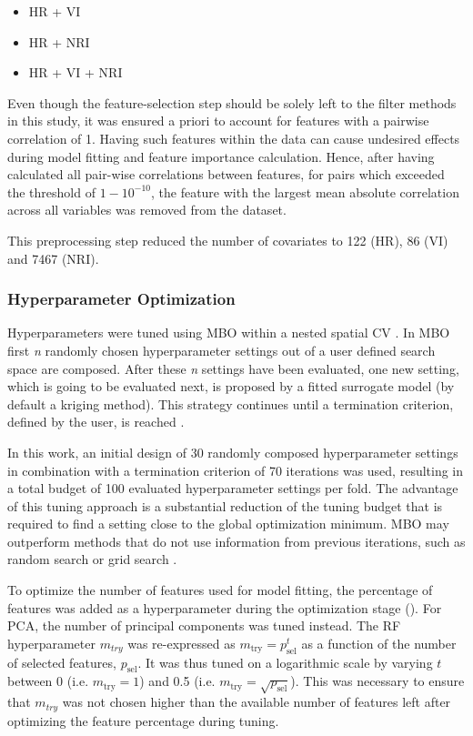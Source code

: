 \documentclass[letterpaper, peerreview, draftcls]{IEEEtran}
\begin{document}
\begin{itemize}
	\item HR + VI %
	\item HR + NRI
	\item HR + VI + NRI
\end{itemize}

Even though the feature-selection step should be solely left to the filter methods in this study, it was ensured a priori to account for features with a pairwise correlation of 1.
Having such features within the data can cause undesired effects during model fitting and feature importance calculation.
Hence, after having calculated all pair-wise correlations between features, for pairs which exceeded the threshold of $1 - 10^{-10}$, the feature with the largest mean absolute correlation across all variables was removed from the dataset.

This preprocessing step reduced the number of covariates to 122 (HR), 86 (VI) and 7467 (NRI).

\subsubsection{Hyperparameter Optimization}

Hyperparameters were tuned using \ac{MBO} within a nested spatial \ac{CV} \cite{mlrmbo, binder2020, schratz2019}.
In MBO first \textit{n} randomly chosen hyperparameter settings out of a user defined search space are composed.
After these \textit{n} settings have been evaluated, one new setting, which is going to be evaluated next, is proposed by a fitted surrogate model (by default a kriging method).
This strategy continues until a termination criterion, defined by the user, is reached \cite{hutter2011, jones1998}.

In this work, an initial design of 30 randomly composed hyperparameter settings in combination with a termination criterion of 70 iterations was used, resulting in a total budget of 100 evaluated hyperparameter settings per fold.
The advantage of this tuning approach is a substantial reduction of the tuning budget that is required to find a setting close to the global optimization minimum.
\ac{MBO} may outperform methods that do not use information from previous iterations, such as random search or grid search \cite{bergstra2012}.

To optimize the number of features used for model fitting, the percentage of features was added as a hyperparameter during the optimization stage (\cite{binder2020}).
For \ac{PCA}, the number of principal components was tuned instead.
The RF hyperparameter \texttt{\(m_{try}\)} was re-expressed as $m_\textrm{try} = p_\textrm{sel}^t$ as a function of the number of selected features, $p_\textrm{sel}$.
It was thus tuned on a logarithmic scale by varying $t$ between 0 (i.e. $m_\textrm{try} = 1$) and 0.5 (i.e. $m_\textrm{try}=\sqrt{p_\textrm{sel}}$).
This was necessary to ensure that \texttt{\(m_{try}\)} was not chosen higher than the available number of features left after optimizing the feature percentage during tuning.
\end{document}
